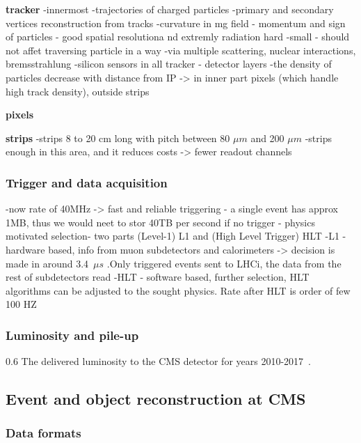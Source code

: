 \textbf{tracker}
-innermost
-trajectories of charged particles
-primary and secondary vertices reconstruction from tracks
-curvature in mg field - momentum and sign of particles
- good spatial resolutiona nd extremly radiation hard
-small
- should not affet traversing particle in a way -via multiple scattering, nuclear interactions, bremsstrahlung
-silicon sensors in all tracker
- detector layers
-the density of particles decrease with distance from IP -> in  inner part pixels (which handle high track density), outside strips


\textbf{pixels}


\textbf{strips}
-strips 8 to 20 cm long with pitch between 80 $\mu m$ and 200 $\mu m$
-strips enough in this area, and it reduces costs -> fewer readout channels

\subsubsection{Trigger and data acquisition}

-now rate of 40MHz -> fast and reliable triggering
- a single event has approx 1MB, thus we would neet to stor 40TB per second if no trigger
- physics motivated selection- two parts (Level-1) L1 and (High Level Trigger) HLT
-L1 - hardware based, info from muon subdetectors and  calorimeters -> decision is made in around 3.4~$\mu s$ .Only triggered events sent to LHCi, the data from the rest of subdetectors read
-HLT - software based, further selection, HLT algorithms can be adjusted to the sought physics. Rate after HLT is order of few 100 HZ  

\subsubsection{Luminosity and pile-up}


                 {0.6}       %
                 { The delivered luminosity to the CMS detector for years 2010-2017~\cite{website:CMSlumi}. }

\newpage

\subsection{Event and object reconstruction at CMS}


\subsubsection{Data formats}
